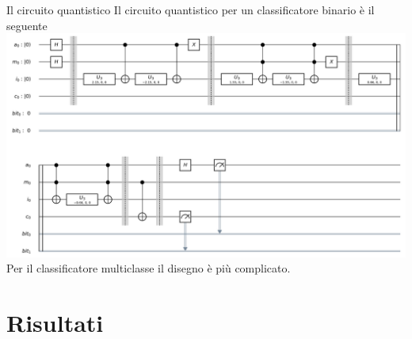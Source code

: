 \documentclass{beamer}
\begin{document}
    \begin{frame}{Il circuito quantistico}
        Il circuito quantistico per un classificatore binario è il seguente
        \includegraphics[width=\textwidth]{gfx/base_circuit_crop}
        Per il classificatore multiclasse il disegno è più complicato. 
    \end{frame}

    \section{Risultati}
\end{document}
